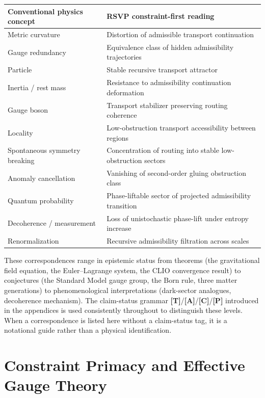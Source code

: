 \documentclass[12pt,a4paper]{article}
\begin{document}
\medskip
{\small
\begin{center}
\begin{tabular}{p{5.2cm}p{6.3cm}}
\toprule
\textbf{Conventional physics concept} & \textbf{RSVP constraint-first reading}\\
\midrule
Metric curvature & Distortion of admissible transport continuation\\
Gauge redundancy & Equivalence class of hidden admissibility trajectories\\
Particle & Stable recursive transport attractor\\
Inertia / rest mass & Resistance to admissibility continuation deformation\\
Gauge boson & Transport stabilizer preserving routing coherence\\
Locality & Low-obstruction transport accessibility between regions\\
Spontaneous symmetry breaking & Concentration of routing into stable low-obstruction sectors\\
Anomaly cancellation & Vanishing of second-order gluing obstruction class\\
Quantum probability & Phase-liftable sector of projected admissibility transition\\
Decoherence / measurement & Loss of unistochastic phase-lift under entropy increase\\
Renormalization & Recursive admissibility filtration across scales\\
\bottomrule
\end{tabular}
\end{center}
}

\medskip\noindent
These correspondences range in epistemic status from theorems (the gravitational
field equation, the Euler--Lagrange system, the CLIO convergence result) to
conjectures (the Standard Model gauge group, the Born rule, three matter
generations) to phenomenological interpretations (dark-sector analogues,
decoherence mechanism). The claim-status grammar \textbf{[T]}/\textbf{[A]}/\textbf{[C]}/\textbf{[P]}
introduced in the appendices is used consistently throughout to distinguish
these levels. When a correspondence is listed here without a claim-status tag,
it is a notational guide rather than a physical identification.

\section{Constraint Primacy and Effective Gauge Theory}
\end{document}
